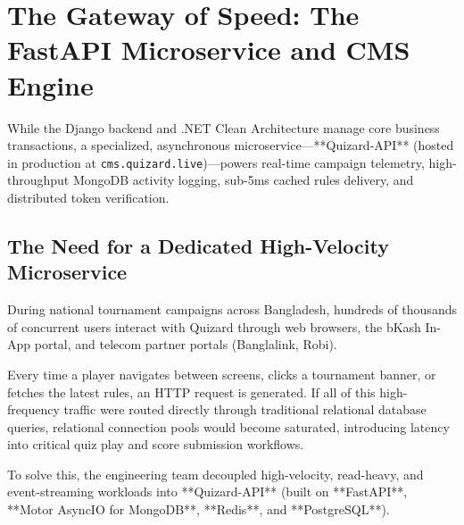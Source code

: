 \chapter{The Gateway of Speed: The FastAPI Microservice and CMS Engine}

\begin{tcolorbox}[storybox, title={The Quizard-API (cms.quizard.live) in Brief}]
While the Django backend and .NET Clean Architecture manage core business transactions, a specialized, asynchronous microservice---**Quizard-API** (hosted in production at \texttt{cms.quizard.live})---powers real-time campaign telemetry, high-throughput MongoDB activity logging, sub-5ms cached rules delivery, and distributed token verification.
\end{tcolorbox}

\section{The Need for a Dedicated High-Velocity Microservice}
During national tournament campaigns across Bangladesh, hundreds of thousands of concurrent users interact with Quizard through web browsers, the bKash In-App portal, and telecom partner portals (Banglalink, Robi). 

Every time a player navigates between screens, clicks a tournament banner, or fetches the latest rules, an HTTP request is generated. If all of this high-frequency traffic were routed directly through traditional relational database queries, relational connection pools would become saturated, introducing latency into critical quiz play and score submission workflows.

To solve this, the engineering team decoupled high-velocity, read-heavy, and event-streaming workloads into **Quizard-API** (built on **FastAPI**, **Motor AsyncIO for MongoDB**, **Redis**, and **PostgreSQL**).

